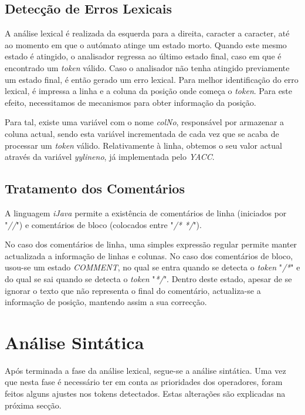\documentclass[11pt,a4paper]{article}
\begin{document}
\subsection{Detecção de Erros Lexicais}

A análise lexical é realizada da esquerda para a direita, caracter a caracter, até ao momento em que o autómato atinge um estado morto. Quando este mesmo estado é atingido, o analisador regressa ao último estado final, caso em que é encontrado um \textit{token} válido. Caso o analisador não tenha atingido previamente um estado final, é então gerado um erro lexical. Para melhor identificação do erro lexical, é impressa a linha e a coluna da posição onde começa o \textit{token}. Para este efeito, necessitamos de mecanismos para obter informação da posição.

Para tal, existe uma variável com o nome \textit{colNo}, responsável por armazenar a coluna actual, sendo esta variável incrementada de cada vez que se acaba de processar um \textit{token} válido. Relativamente à linha, obtemos o seu valor actual através da variável \textit{yylineno}, já implementada pelo \textit{YACC}.


\subsection{Tratamento dos Comentários}

A linguagem \textit{iJava} permite a existência de comentários de linha (iniciados por "\textit{//}") e comentários de bloco (colocados entre "\textit{/* */}").

No caso dos comentários de linha, uma simples expressão regular permite manter actualizada a informação de linhas e colunas. No caso dos comentários de bloco, usou-se um estado \textit{COMMENT}, no qual se entra quando se detecta o \textit{token} "\textit{/*}" e do qual se sai quando se detecta o \textit{token} "\textit{*/}". Dentro deste estado, apesar de se ignorar o texto que não representa o final do comentário, actualiza-se a informação de posição, mantendo assim a sua correcção.

\newpage

\section{Análise Sintática}

Após terminada a fase da análise lexical, segue-se a análise sintática. Uma vez que nesta fase é necessário ter em conta as prioridades dos operadores, foram feitos alguns ajustes nos tokens detectados. Estas alterações são explicadas na próxima secção.
\end{document}
